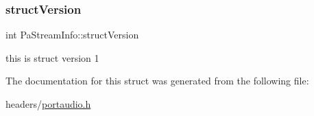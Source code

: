 \subsubsection{\texorpdfstring{struct\+Version}{structVersion}}
{\footnotesize\ttfamily int Pa\+Stream\+Info\+::struct\+Version}

this is struct version 1 

The documentation for this struct was generated from the following file\+:\begin{DoxyCompactItemize}
\item 
headers/\hyperlink{portaudio_8h}{portaudio.\+h}\end{DoxyCompactItemize}
